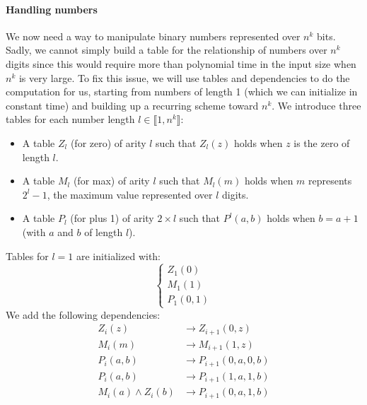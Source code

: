 \documentclass{../../cs-classes/cs-classes}
\begin{document}
\begin{exercise}
    \paragraph*{Handling numbers} We now need a way to manipulate binary numbers represented over $n^k$ bits. Sadly, we cannot simply build a table for the relationship of numbers over $n^k$ digits since this would require more than polynomial time in the input size when $n^k$ is very large. To fix this issue, we will use tables and dependencies to do the computation for us, starting from numbers of length 1 (which we can initialize in constant time) and building up a recurring scheme toward $n^k$. We introduce three tables for each number length $l\in\llbracket 1, n^k \rrbracket$:
    \begin{itemize}
        \item A table $Z_l$ (for zero) of arity $l$ such that $Z_l(z)$ holds when $z$ is the zero of length $l$.
        \item A table $M_l$ (for max) of arity $l$ such that $M_l(m)$ holds when $m$ represents $2^l-1$, the maximum value represented over $l$ digits.
        \item A table $P_l$ (for plus 1) of arity $2\times l$ such that $P^l(a, b)$ holds when $b=a+1$ (with $a$ and $b$ of length $l$).
    \end{itemize}
    Tables for $l=1$ are initialized with:
    \begin{equation*}
        \begin{cases}
            Z_1(0) \\
            M_1(1) \\
            P_1(0, 1)
        \end{cases}
    \end{equation*}
    We add the following dependencies:
    \begin{equation*}
        \begin{aligned}
            Z_i(z)              & \rightarrow Z_{i+1}(0, z)       \\
            M_i(m)              & \rightarrow M_{i+1}(1, z)       \\
            P_i(a, b)           & \rightarrow P_{i+1}(0, a, 0, b) \\
            P_i(a, b)           & \rightarrow P_{i+1}(1, a, 1, b) \\
            M_i(a) \land Z_i(b) & \rightarrow P_{i+1}(0, a, 1, b)
        \end{aligned}
    \end{equation*}


\end{exercise}
\end{document}
